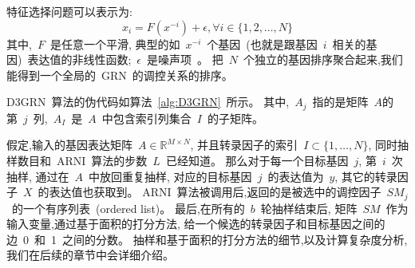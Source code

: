 特征选择问题可以表示为:
\begin{equation}
\label{eq:fs}
x_i =  F(x^{-i}) + \epsilon , \forall i \in \{1,2,\ldots,N\}
\end{equation}
其中,~$F$~是任意一个平滑, 典型的如~$x^{-i}$~个基因~(也就是跟基因~$i$~相关的基因)~表达值的非线性函数;~$\epsilon$~是噪声项~\cite{huynh2010inferring,Haury2012}。
把~$N$~个独立的基因排序聚合起来,我们能得到一个全局的~GRN~的调控关系的排序。


D3GRN~算法的伪代码如算法~\ref{alg:D3GRN}~所示。
其中,~$A_j$~指的是矩阵~$A$的第~$j$~列,~$A_I$~是~$A$~中包含索引列集合~$I$~的子矩阵。

假定,输入的基因表达矩阵~$A \in \mathbb{R}^{M \times N}$, 
并且转录因子的索引~$I \subset \{1,\ldots,N\}$, 
同时抽样数目和~ARNI~算法的步数~$L$~已经知道。
那么对于每一个目标基因~$j$, 第~$i$~次抽样,
通过在~$A$~中放回重复抽样,
对应的目标基因~$j$~的表达值为~$y$, 
其它的转录因子~$X$~的表达值也获取到。
ARNI~算法被调用后,返回的是被选中的调控因子~$SM_j$~的一个有序列表~(ordered list)。
最后,在所有的~$b$~轮抽样结束后,
矩阵~$SM$~作为输入变量,通过基于面积的打分方法,
给一个候选的转录因子和目标基因之间的边~0~和~1~之间的分数。
抽样和基于面积的打分方法的细节,以及计算复杂度分析,我们在后续的章节中会详细介绍。
 
